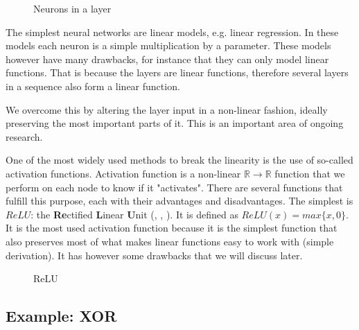 \begin{figure}[h]
\center
\caption{Neurons in a layer}
\label{nndiagram1}
\medskip
{}
\end{figure}	

The simplest neural networks are linear models, e.g. linear regression. In these models each neuron is a simple multiplication by a parameter. These models   however have many drawbacks, for instance that they can only model linear functions. That is because the layers are linear functions, therefore several layers in a sequence also form a linear function.

We overcome this by altering the layer input in a non-linear fashion, ideally preserving the most important parts of it. This is an important area of ongoing research.

One of the most widely used methods to break the linearity is the use of so-called activation functions. Activation function is a non-linear $\mathbb{R}\rightarrow \mathbb{R}$ function that we perform on each node to know if it "activates". There are several functions that fulfill this purpose, each with their advantages and disadvantages. The simplest is $ReLU$: the \textbf{Re}ctified \textbf{L}inear \textbf{U}nit (\cite{relu1}, \cite{relu2}, \cite{relu3}). It is defined as $ReLU(x)=max\{x,0\}$. It is the most used activation function because it is the simplest function that also preserves most of what makes linear functions easy to work with (simple derivation). It has however some drawbacks that we will discuss later.

\begin{figure}[h]
\caption{ReLU}
\center
{}
\end{figure}

\subsection{Example: XOR}

